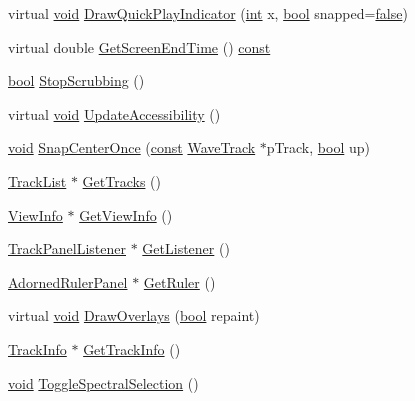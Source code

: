 \begin{DoxyCompactItemize}
\item 
virtual \hyperlink{sound_8c_ae35f5844602719cf66324f4de2a658b3}{void} \hyperlink{class_track_panel_ace5b33aeb78931e4525122bcbd64e16d}{Draw\+Quick\+Play\+Indicator} (\hyperlink{xmltok_8h_a5a0d4a5641ce434f1d23533f2b2e6653}{int} x, \hyperlink{mac_2config_2i386_2lib-src_2libsoxr_2soxr-config_8h_abb452686968e48b67397da5f97445f5b}{bool} snapped=\hyperlink{mac_2config_2i386_2lib-src_2libsoxr_2soxr-config_8h_a65e9886d74aaee76545e83dd09011727}{false})
\item 
virtual double \hyperlink{class_track_panel_ab5a83bffa16363506f7ff3de1939da9a}{Get\+Screen\+End\+Time} () \hyperlink{getopt1_8c_a2c212835823e3c54a8ab6d95c652660e}{const} 
\item 
\hyperlink{mac_2config_2i386_2lib-src_2libsoxr_2soxr-config_8h_abb452686968e48b67397da5f97445f5b}{bool} \hyperlink{class_track_panel_a920c19185763a5cf27fe883ceb683db4}{Stop\+Scrubbing} ()
\item 
virtual \hyperlink{sound_8c_ae35f5844602719cf66324f4de2a658b3}{void} \hyperlink{class_track_panel_a4ae519c0a1506e9ec7de57e63141fc1c}{Update\+Accessibility} ()
\item 
\hyperlink{sound_8c_ae35f5844602719cf66324f4de2a658b3}{void} \hyperlink{class_track_panel_a22ab2290703b148a0fac924257b5ee2a}{Snap\+Center\+Once} (\hyperlink{getopt1_8c_a2c212835823e3c54a8ab6d95c652660e}{const} \hyperlink{class_wave_track}{Wave\+Track} $\ast$p\+Track, \hyperlink{mac_2config_2i386_2lib-src_2libsoxr_2soxr-config_8h_abb452686968e48b67397da5f97445f5b}{bool} up)
\item 
\hyperlink{class_track_list}{Track\+List} $\ast$ \hyperlink{class_track_panel_aa61f29d8611a7105b2fbccc3e5cfc13e}{Get\+Tracks} ()
\item 
\hyperlink{class_view_info}{View\+Info} $\ast$ \hyperlink{class_track_panel_a326e04740dca49b0f0d99abed01ab994}{Get\+View\+Info} ()
\item 
\hyperlink{class_track_panel_listener}{Track\+Panel\+Listener} $\ast$ \hyperlink{class_track_panel_a0b0ae7e30b7a52410ee539e7b8b3e6bd}{Get\+Listener} ()
\item 
\hyperlink{class_adorned_ruler_panel}{Adorned\+Ruler\+Panel} $\ast$ \hyperlink{class_track_panel_a0e1536359e60ab276961fcd901fba445}{Get\+Ruler} ()
\item 
virtual \hyperlink{sound_8c_ae35f5844602719cf66324f4de2a658b3}{void} \hyperlink{class_track_panel_ad3c380c2377c504b2b86cdbdee4f3d5f}{Draw\+Overlays} (\hyperlink{mac_2config_2i386_2lib-src_2libsoxr_2soxr-config_8h_abb452686968e48b67397da5f97445f5b}{bool} repaint)
\item 
\hyperlink{class_track_info}{Track\+Info} $\ast$ \hyperlink{class_track_panel_a77b468f481ac8194d8f8373e73f427fc}{Get\+Track\+Info} ()
\item 
\hyperlink{sound_8c_ae35f5844602719cf66324f4de2a658b3}{void} \hyperlink{class_track_panel_a4f68a782df06c159370e9e77d0468f0a}{Toggle\+Spectral\+Selection} ()
\end{DoxyCompactItemize}
